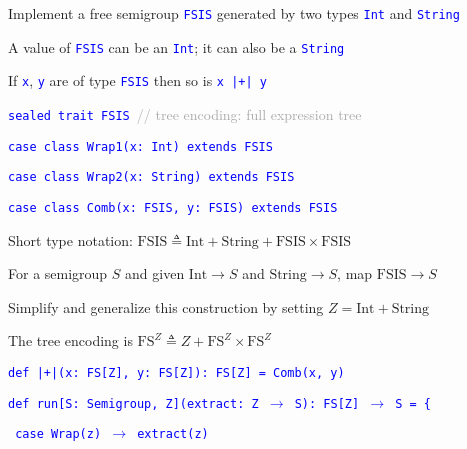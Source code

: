 Implement a free semigroup \texttt{\textcolor{blue}{\footnotesize{}FSIS}}
generated by two types \texttt{\textcolor{blue}{\footnotesize{}Int}}
and \texttt{\textcolor{blue}{\footnotesize{}String}} 

A value of \texttt{\textcolor{blue}{\footnotesize{}FSIS}} can be an
\texttt{\textcolor{blue}{\footnotesize{}Int}}; it can also be a \texttt{\textcolor{blue}{\footnotesize{}String}} 

If \texttt{\textcolor{blue}{\footnotesize{}x}}, \texttt{\textcolor{blue}{\footnotesize{}y}}
are of type \texttt{\textcolor{blue}{\footnotesize{}FSIS}} then so
is \texttt{\textcolor{blue}{\footnotesize{}x |+| y}} 

\texttt{\textcolor{blue}{\footnotesize{}sealed trait FSIS }}\textcolor{darkgray}{\footnotesize{}//
tree encoding: full expression tree}{\footnotesize\par}

\texttt{\textcolor{blue}{\footnotesize{}case class Wrap1(x: Int) extends
FSIS}}{\footnotesize\par}

\texttt{\textcolor{blue}{\footnotesize{}case class Wrap2(x: String)
extends FSIS}}{\footnotesize\par}

\texttt{\textcolor{blue}{\footnotesize{}case class Comb(x: FSIS, y: FSIS)
extends FSIS}}{\footnotesize\par}

Short type notation: $\text{FSIS}\triangleq\text{Int}+\text{String}+\text{FSIS}\times\text{FSIS}$ 

For a semigroup $S$ and given $\text{Int}\rightarrow S$ and $\text{String}\rightarrow S$,
map $\text{FSIS}\rightarrow S$

Simplify and generalize this construction by setting $Z=\text{Int}+\text{String}$

The tree encoding is $\text{FS}^{Z}\triangleq Z+\text{FS}^{Z}\times\text{FS}^{Z}$

\texttt{\textcolor{blue}{\footnotesize{}def |+|(x: FS{[}Z{]}, y: FS{[}Z{]}): FS{[}Z{]}
= Comb(x, y)}}{\footnotesize\par}

\texttt{\textcolor{blue}{\footnotesize{}def run{[}S: Semigroup, Z{]}(extract: Z
$\rightarrow$ S): FS{[}Z{]} $\rightarrow$ S = \{}}{\footnotesize\par}

\texttt{\textcolor{blue}{\footnotesize{}  case Wrap(z) $\rightarrow$
extract(z)}}{\footnotesize\par}

